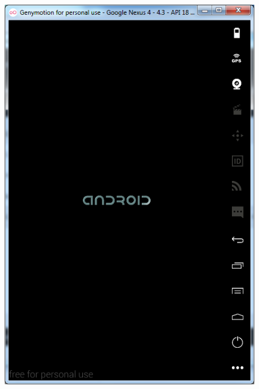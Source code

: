 \documentclass[13pt,a4paper]{extreport}
\begin{document}
\begin{itemize}
\begin{itemize}
\begin{figure}[!h]
\begin{center}
									{\includegraphics[scale=.5]{setup-genymotion-31}}
								\hspace{1.5cm}

\end{center}
\end{figure}
\end{itemize}
\end{itemize}
\end{document}

